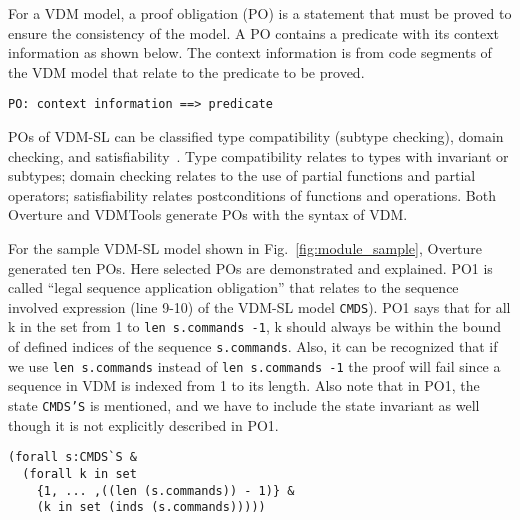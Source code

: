
For a VDM model, a proof obligation (PO) is a statement that must be proved to ensure the consistency of the model. A PO contains a predicate with its context information as shown below. The context information is from code segments of the VDM model that relate to the predicate to be proved.

\begin{mdframed}[roundcorner=5pt]
\begin{Verbatim}[fontsize=\small]
PO: context information ==> predicate
\end{Verbatim}
\end{mdframed}

POs of VDM-SL can be classified type compatibility (subtype checking), domain checking, and satisfiability~\cite{AL:97:POGV,Vermolen:2010:PCV:1774088.1774608}. Type compatibility relates to types with invariant or subtypes; domain checking relates to the use of partial functions and partial operators; satisfiability relates postconditions of functions and operations. Both Overture and VDMTools generate POs with the syntax of VDM.

For the sample VDM-SL model shown in Fig.~\ref{fig:module_sample}, Overture generated ten POs. Here selected POs are demonstrated and explained. PO1 is called ``legal sequence application obligation'' that relates to the sequence involved expression (line 9-10) of the VDM-SL model {\tt CMDS}). PO1 says that for all k in the set from 1 to {\tt len s.commands -1}, k should always be within the bound of defined indices of the sequence {\tt s.commands}. Also, it can be recognized that if we use {\tt len s.commands} instead of {\tt len s.commands -1} the proof will fail since a sequence in VDM is indexed from 1 to its length. Also note that in PO1, the state {\tt CMDS'S} is mentioned, and we have to include the state invariant as well though it is not explicitly described in PO1.

\begin{mdframed}[roundcorner=5pt]
\begin{Verbatim}[fontsize=\small]
(forall s:CMDS`S & 
  (forall k in set 
    {1, ... ,((len (s.commands)) - 1)} & 
    (k in set (inds (s.commands)))))
\end{Verbatim}
\end{mdframed}


